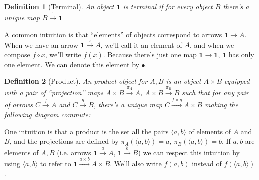 \documentclass{article}
\newtheorem{definition}{Definition}
\begin{document}
\begin{definition}[Terminal]
  An object $\mathbf{1}$ is terminal if for every object $B$ there's a unique
  map $B\xrightarrow{!} \mathbf{1}$
\end{definition} 
A common intuition is that ``elements'' of objects correspond to arrows
$\mathbf{1}\rightarrow A$. When we have an arrow $\mathbf{1}\xrightarrow{x} A$,
we'll call it an element of $A$, and when we compose $f\circ x$, we'll write
$f(x)$. Because there's just one map $\mathbf{1}\rightarrow\mathbf{1}$,
$\mathbf{1}$ has only one element. We can denote this element by $\bullet$.

\begin{definition}[Product]
An product object for $A,B$ is an object $A\times B$ equipped with a pair of
``projection'' maps $A\times B\xrightarrow{\pi_A} A$, $A\times
B\xrightarrow{\pi_B} B$ such that for any pair of arrows $C\xrightarrow{f} A$
and $C\xrightarrow{g} B$, there's a unique map $C\xrightarrow{f\times g} A\times
B$ making the following diagram commute:
\begin{center}
\end{center}
\end{definition}
One intuition is that a product is the set all the pairs $\langle a,b\rangle$ of
elements of $A$ and $B$, and the projections are defined by $\pi_A(\langle a,
b\rangle) = a$, $\pi_B(\langle a, b\rangle) = b$. If $a,b$ are elements of $A,B$
(i.e. arrows $\mathbf{1}\xrightarrow{a} A$, $\mathbf{1}\xrightarrow{b} B$) we
can respect this intuition by using $\langle a,b\rangle$ to refer to
$\mathbf{1}\xrightarrow{a\times b} A\times B$. We'll also write $f(a,b)$ instead
of $f(\langle a, b\rangle)$.
\end{document}

